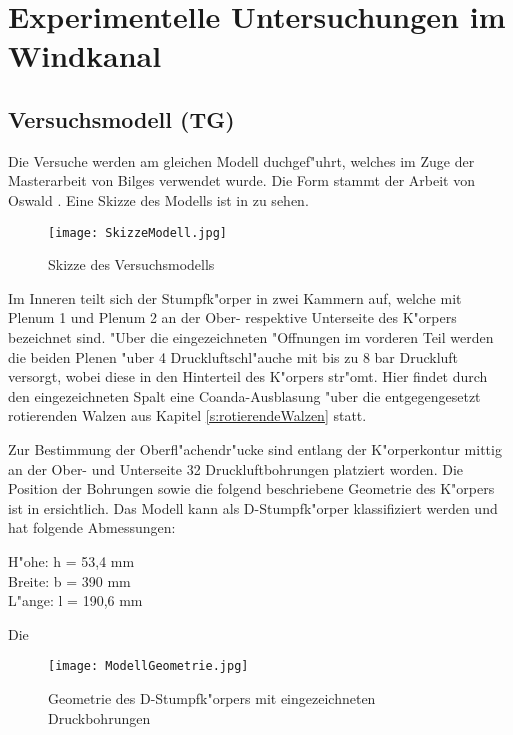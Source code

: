 \chapter{Experimentelle Untersuchungen im Windkanal}\label{s:versuche}


\section{Versuchsmodell (TG)}
Die Versuche werden am gleichen Modell duchgef"uhrt, welches im Zuge der Masterarbeit von Bilges \cite{Bilges.2018} verwendet wurde. Die Form stammt der Arbeit von Oswald \cite{Oswald.2017}. Eine Skizze des Modells ist in  zu sehen.

\begin{figure}[h]
	\centering
	\texttt{[image: SkizzeModell.jpg]}
	\caption{Skizze des Versuchsmodells \citep{Bilges.2018}}
	\label{fig:SkizzeModell}
\end{figure}

Im Inneren teilt sich der Stumpfk"orper in zwei Kammern auf, welche mit Plenum 1 und Plenum 2 an der Ober- respektive Unterseite des K"orpers bezeichnet sind. "Uber die eingezeichneten "Offnungen im vorderen Teil werden die beiden Plenen "uber 4 Druckluftschl"auche mit bis zu 8 bar Druckluft versorgt, wobei diese in den Hinterteil des K"orpers str"omt. Hier findet durch den eingezeichneten Spalt eine Coanda-Ausblasung "uber die entgegengesetzt rotierenden Walzen aus Kapitel \ref{s:rotierendeWalzen} statt.

Zur Bestimmung der Oberfl"achendr"ucke sind entlang der K"orperkontur mittig an der Ober- und Unterseite 32 Druckluftbohrungen platziert worden. Die Position der Bohrungen sowie die folgend beschriebene Geometrie des K"orpers ist in  ersichtlich. Das Modell kann als D-Stumpfk"orper klassifiziert werden und hat folgende Abmessungen: 
\begin{center}
H"ohe: h = 53,4 mm\\
Breite: b = 390 mm\\
L"ange: l = 190,6 mm\\ 
\end{center}
Die 

\begin{figure}[h]
	\centering
	\texttt{[image: ModellGeometrie.jpg]}
	\caption{Geometrie des D-Stumpfk"orpers mit eingezeichneten Druckbohrungen \citep{Bilges.2018}}
	\label{fig:ModellGeometrie}
\end{figure}


